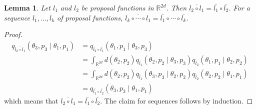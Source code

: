 \documentclass[english,twoside,openright]{HYgraduMLDS}
\newtheorem{lemma}{Lemma}
\newcommand{\R}{\mathbb{R}}
\begin{document}
\begin{lemma}\label{prop_fun_comp_lemma}
  Let \(l_{1}\) and \(l_{2}\) be proposal functions in \(\R^{2d}\).
  Then \(\overline{l_{2} \circ l_{1}} = \bar{l_{1}}\circ \bar{l_{2}}\).
  For a sequence \(l_{1}, \dotsc, l_{k}\) of proposal functions,
  \(\overline{l_{k}\circ \dotsb \circ l_{1}} = \bar{l_{1}}\circ \dotsb \circ \bar{l_{k}}\).
\end{lemma}
\begin{proof}
  \begin{align*}
	q_{\overline{l_{2}\circ l_{1}}}(\theta_{3}, p_{3}\mid \theta_{1}, p_{1})
    &= q_{l_{2}\circ l_{1}}(\theta_{1}, p_{1}\mid \theta_{3}, p_{3})
    \\&= \int_{\R^{2d}} d(\theta_{2}, p_{2}) q_{l_{1}}(\theta_{2}, p_{2}\mid \theta_{3}, p_{3})
      q_{l_{2}}(\theta_{1}, p_{1}\mid \theta_{2}, p_{2})
    \\&= \int_{\R^{2d}} d(\theta_{2}, p_{2}) q_{\bar{l}_{1}}(\theta_{3}, p_{3}\mid \theta_{2}, p_{2})
      q_{\bar{l}_{2}}(\theta_{2}, p_{2}\mid \theta_{1}, p_{1})
    \\&= q_{\bar{l_{1}}\circ \bar{l_{2}}}(\theta_{3}, p_{3}\mid \theta_{1}, p_{1})
  \end{align*}
  which means that \(\overline{l_{2} \circ l_{1}} = \bar{l_{1}}\circ \bar{l_{2}}\).
  The claim for sequences follows by induction.
\end{proof}
\end{document}
